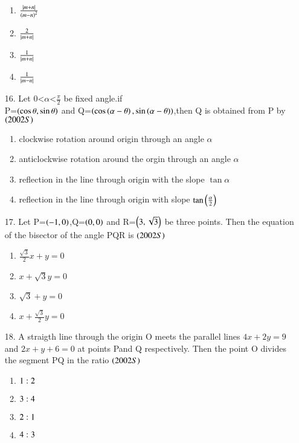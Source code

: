 \documentclass[journal,12pt,onecolumn]{IEEEtran}
\theoremstyle{remark}
\begin{document}
\begin{enumerate}
\begin{enumerate}
     \item $\frac{\left\vert m+n\right\vert}{\left(m-n\right)^2}$
     \item $\frac{2}{\left\vert m+n\right\vert}$
     \item $\frac{1}{\left\vert m+n\right\vert}$
     \item $\frac{1}{\left\vert m-n\right\vert}$
    
\end{enumerate}
\item[16.] Let $0$\textless $\alpha $\textless $\frac{\pi}{2}$ be fixed angle.if\\
P=$\left(\cos\theta,\sin\theta\right)$ and Q=$\left(\cos\left(\alpha-\theta\right),\sin\left(\alpha-\theta\right)\right)$,then Q is obtained from P by
\hfill{$\left(2002S\right)$}
\begin{enumerate}
    \item clockwise rotation around origin through an angle $\alpha$
    \item anticlockwise rotation around the orgin through an angle $\alpha$
    \item reflection in the line through origin with the slope $\tan\alpha$
    \item reflection in the line through origin with slope $\tan\left(\frac{\alpha}{2}\right)$
\end{enumerate}
\item[17.] Let P=$\left(-1,0\right)$,Q=$\left(0,0\right)$ and R=$\left(3,\sqrt{3}\right)$ be three points. Then the equation of the bisector of the angle PQR is 
\hfill{$\left(2002S\right)$}
\begin{enumerate}
    
        \item $\frac{\sqrt{3}}{2}x+y=0$
        \item $x+\sqrt{3}y=0$
        \item $\sqrt{3}+y=0$
        \item $x+\frac{\sqrt{3}}{2}y=0$
    
\end{enumerate}
\item[18.] A straigth line through the origin O meets the parallel lines $4x+2y=9$ and $2x+y+6=0$ at points Pand Q respectively. Then the point O divides the segment PQ in the ratio 
\hfill{$\left(2002S\right)$}
\begin{enumerate}

     \item $1 : 2$
     \item $3 : 4$
     \item $2 : 1$
     \item $4 : 3$

\end{enumerate}
\end{enumerate}
\end{document}
